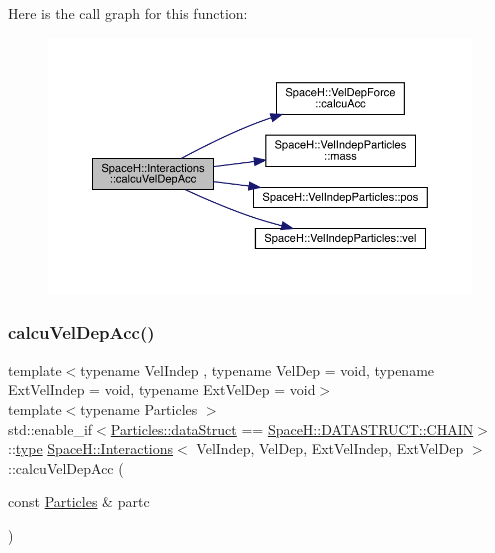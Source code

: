 Here is the call graph for this function\+:
\nopagebreak
\begin{figure}[H]
\begin{center}
\leavevmode
\includegraphics[width=350pt]{class_space_h_1_1_interactions_abe696c7b0b263c1f86af6e2b131777fc_cgraph}
\end{center}
\end{figure}
\mbox{\label{class_space_h_1_1_interactions_aedfdfea7ed97d4ee203b8779ae58b202}} 
\subsubsection{\texorpdfstring{calcu\+Vel\+Dep\+Acc()}{calcuVelDepAcc()}\hspace{0.1cm}{\footnotesize\ttfamily [2/2]}}
{\footnotesize\ttfamily template$<$typename Vel\+Indep , typename Vel\+Dep  = void, typename Ext\+Vel\+Indep  = void, typename Ext\+Vel\+Dep  = void$>$ \\
template$<$typename Particles $>$ \\
std\+::enable\+\_\+if$<$\mbox{\hyperlink{class_space_h_1_1_vel_indep_particles_a066cbb08e0d444c27e2f71c30092e13f}{Particles\+::data\+Struct}} == \mbox{\hyperlink{namespace_space_h_a4782f089179a3c269891f02482b072dfa014d2cf3cdc3af6f4f92c09190860e33}{Space\+H\+::\+D\+A\+T\+A\+S\+T\+R\+U\+C\+T\+::\+C\+H\+A\+IN}}$>$\+::\mbox{\hyperlink{class_space_h_1_1_interactions_aa45fc9367bfa0b8693700525ffa2655f}{type}} \mbox{\hyperlink{class_space_h_1_1_interactions}{Space\+H\+::\+Interactions}}$<$ Vel\+Indep, Vel\+Dep, Ext\+Vel\+Indep, Ext\+Vel\+Dep $>$\+::calcu\+Vel\+Dep\+Acc (\begin{DoxyParamCaption}\item[{const \mbox{\hyperlink{struct_space_h_1_1_particles}{Particles}} \&}]{partc }\end{DoxyParamCaption})\hspace{0.3cm}{\ttfamily [inline]}}


